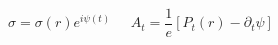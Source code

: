 \begin{equation}
\sigma= \sigma(r)e^{i\psi(t)} \;\;\;\;\; A_t = 
\frac{1}{e}[P_t(r)-\partial_t \psi]
\end{equation}

